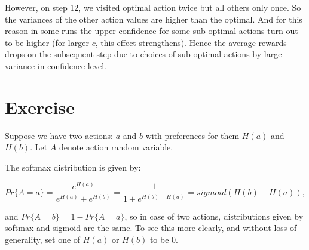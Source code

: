 \documentclass[11pt,a4paper]{report}
\begin{document}
However, on step 12, we visited optimal action twice but all others only once. So the variances of the other action values are higher than the optimal. And for this reason in some runs the upper confidence for some sub-optimal actions turn out to be higher (for larger $c$, this effect strengthens). Hence the average rewards drops on the subsequent step due to choices of sub-optimal actions by large variance in confidence level.

\section{Exercise}
Suppose we have two actions: $a$ and $b$ with preferences for them $H(a)$ and $H(b)$.
Let $A$ denote action random variable.

The softmax distribution is given by:

$$ Pr\{A=a\} = \frac{e^{H(a)}}{e^{H(a)} + e^{H(b)}}= \frac{1}{1 + e^{H(b) - H(a)}} = sigmoid(H(b) - H(a)),$$

and $Pr\{A=b\} = 1-Pr\{A=a\}$, so in case of two actions, distributions given by softmax and sigmoid are the same. To see this more clearly, and without loss of generality, set one of $H(a)$ or $H(b)$ to be $0$.
\end{document}
